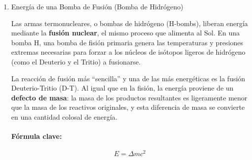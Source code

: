 \documentclass[11pt,a4paper]{article}
\begin{document}
\begin{enumerate}
\subsection*{Interpretación y Contexto: ¿Qué tan grande es esta energía?}
Para poner en perspectiva los \SI{71.4}{\tera\joule}:
\begin{itemize}
    \item \textbf{Equivalencia en TNT:} La energía liberada por la explosión de \SI{1}{\tonne} de TNT es de unos \SI{4.184}{\giga\joule} (\SI{4.184e9}{\joule}).
    \[ \text{Equivalente en TNT} = \frac{\SI{7.14e13}{\joule}}{\SI{4.184e9}{\joule\per\tonne}} \approx \num{17065} \text{ toneladas de TNT} \]
    Esto es comparable a la potencia de la bomba de Hiroshima (estimada entre 15 y 20 kilotones).
\end{itemize}

\paragraph{Conclusión del ejercicio:} Este problema demuestra claramente cómo la fórmula $E = \Delta m c^2$ se aplica en el mundo real. La aniquilación de una cantidad de masa casi imperceptible a nivel atómico (solo el \SI{0.08}{\percent} de la masa inicial se ``pierde''), al ser multiplicada por el gigantesco valor de $c^2$, se traduce en una liberación de energía de proporciones masivas.



\item Energía de una Bomba de Fusión (Bomba de Hidrógeno)

Las armas termonucleares, o bombas de hidrógeno (H-bombs), liberan energía mediante la \textbf{fusión nuclear}, el mismo proceso que alimenta al Sol. En una bomba H, una bomba de fisión primaria genera las temperaturas y presiones extremas necesarias para forzar a los núcleos de isótopos ligeros de hidrógeno (como el Deuterio y el Tritio) a fusionarse.

La reacción de fusión más ``sencilla'' y una de las más energéticas es la fusión Deuterio-Tritio (D-T). Al igual que en la fisión, la energía proviene de un \textbf{defecto de masa}: la masa de los productos resultantes es ligeramente menor que la masa de los reactivos originales, y esta diferencia de masa se convierte en una cantidad colosal de energía.

\paragraph{Fórmula clave:}
\[ E = \Delta m c^2 \]


\end{enumerate}
\end{document}
